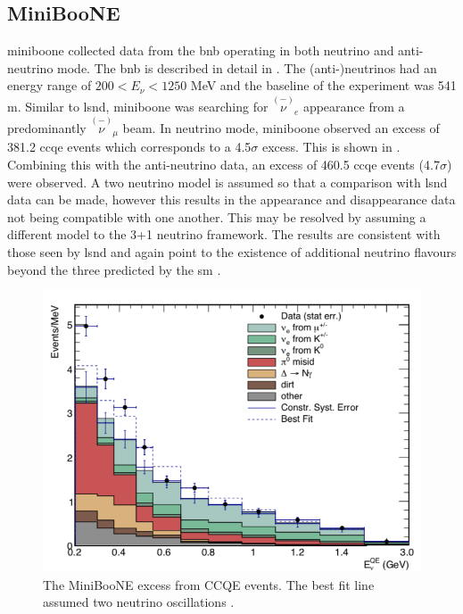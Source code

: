\subsection{MiniBooNE}
\gls{miniboone} collected data from the \gls{bnb} operating in both neutrino and anti-neutrino mode. The \gls{bnb} is described in detail in . The (anti-)neutrinos had an energy range of $200 < E_\nu < 1250$ MeV and the baseline of the experiment was 541 m. Similar to \gls{lsnd}, \gls{miniboone} was searching for  $\overset{\scriptscriptstyle(-)}{\nu}_e$ appearance from a predominantly $\overset{\scriptscriptstyle(-)}{\nu}_{\mu}$ beam. In neutrino mode, \gls{miniboone} observed an excess of 381.2 \gls{ccqe} events which corresponds to a 4.5$\sigma$ excess. This is shown in . Combining this with the anti-neutrino data, an excess of 460.5 \gls{ccqe} events (4.7$\sigma$) were observed. A two neutrino model is assumed so that a comparison with \gls{lsnd} data can be made, however this results in the appearance and disappearance data not being compatible with one another. This may be resolved by assuming a different model to the 3+1 neutrino framework. The results are consistent with those seen by \gls{lsnd} and again point to the existence of additional neutrino flavours beyond the three predicted by the \gls{sm} \cite{MiniBooNE_excess}. 
\begin{figure}[h!]
    \centering
    \includegraphics[width = \largefigwidth]{figures-chap2/MiniBooNE_excess.png}
    \caption[MiniBooNE excess.]{The MiniBooNE excess from \nue CCQE events. The best fit line assumed two neutrino oscillations \cite{MiniBooNE_excess}.}
    \label{fig:MiniBooNE excess}
\end{figure}
\newpage

